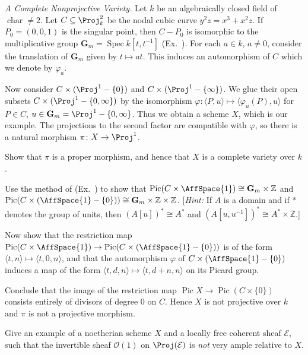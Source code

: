 {{\begin{description}[style=multiline,labelwidth=3.15em,leftmargin=3.45em,itemsep=3pt,topsep=0pt,parsep=0pt]
\item[\hypertarget{ex-II-7.13}{}*7.13.] \emph{A Complete Nonprojective Variety.} Let $k$ be an algebraically closed field of $\operatorname{char}\ne2$. Let $C\subseteq\Proj_k^2$ be the nodal cubic curve $y^2z=x^3+x^2z$. If $P_0=(0,0,1)$ is the singular point, then $C-P_0$ is isomorphic to the multiplicative group $\mathbf G_m=\operatorname{Spec}k[t,t^{-1}]$ (Ex.~). For each $a\in k$, $a\ne0$, consider the translation of $\mathbf G_m$ given by $t\mapsto at$. This induces an automorphism of $C$ which we denote by $\varphi_a$.

\hspace{1em}Now consider $C\times(\Proj^1-\{0\})$ and $C\times(\Proj^1-\{\infty\})$. We glue their open subsets $C\times(\Proj^1-\{0,\infty\})$ by the isomorphism $\varphi\colon\langle P,u\rangle\mapsto\langle\varphi_u(P),u\rangle$ for $P\in C$, $u\in\mathbf G_m=\Proj^1-\{0,\infty\}$. Thus we obtain a scheme $X$, which is our example. The projections to the second factor are compatible with $\varphi$, so there is a natural morphism $\pi\colon X\to\Proj^1$.
\begin{parts}
\item Show that $\pi$ is a proper morphism, and hence that $X$ is a complete variety over $k$.
\item Use the method of (Ex.~) to show that $\operatorname{Pic}(C\times\AffSpace{1})\cong\mathbf G_m\times\mathbb Z$ and $\operatorname{Pic}(C\times(\AffSpace{1}-\{0\}))\cong\mathbf G_m\times\mathbb Z\times\mathbb Z$. [\emph{Hint:} If $A$ is a domain and if $*$ denotes the group of units, then $(A[u])^*\cong A^*$ and $(A[u,u^{-1}])^*\cong A^*\times\mathbb Z$.]
\item Now show that the restriction map $\operatorname{Pic}(C\times\AffSpace{1})\to\operatorname{Pic}(C\times(\AffSpace{1}-\{0\}))$ is of the form $\langle t,n\rangle\mapsto\langle t,0,n\rangle$, and that the automorphism $\varphi$ of $C\times(\AffSpace{1}-\{0\})$ induces a map of the form $\langle t,d,n\rangle\mapsto\langle t,d+n,n\rangle$ on its Picard group.
\item Conclude that the image of the restriction map $\operatorname{Pic}X\to\operatorname{Pic}(C\times\{0\})$ consists entirely of divisors of degree $0$ on $C$. Hence $X$ is not projective over $k$ and $\pi$ is not a projective morphism.
\end{parts}
\item[\hypertarget{ex-II-7.14}{}7.14.]
\begin{parts}
\item Give an example of a noetherian scheme $X$ and a locally free coherent sheaf $\mathcal E$, such that the invertible sheaf $\mathcal O(1)$ on $\Proj(\mathcal E)$ is \emph{not} very ample relative to $X$.
\end{parts}
\end{description}
}
}
